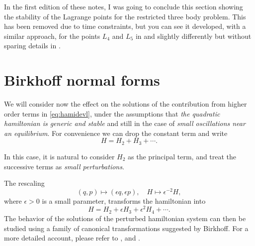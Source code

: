 \documentclass[english,fontsize=11pt,paper=b5]{scrbook}
\theoremstyle{definition}
\begin{document}
      In the first edition of these notes, I was going to conclude this section showing the stability of the Lagrange points for the restricted three body problem.
      This has been removed due to time constraints, but you can see it developed, with a similar approach, for the points $L_4$ and $L_5$ in \cite[Chapter 2.10]{book:lowenstein} and slightly differently but without sparing details in \cite{book:arnoldcelestial,book:celletti}.

      \section{Birkhoff normal forms}

      We will consider now the effect on the solutions of the contribution from higher order terms in \eqref{eq:hamidevl}, under the assumptions that \emph{the quadratic hamiltonian is generic and stable} and still in the case of \emph{small oscillations near an equilibrium}.
      For convenience we can drop the constant term and write
      \begin{equation}
        H = H_2 + H_3 + \cdots.
      \end{equation}

      In this case, it is natural to consider $H_2$ as the principal term, and treat the successive terms as \emph{small perturbations}.

      The rescaling
      \begin{equation}
        (q, p)\mapsto (\epsilon q, \epsilon p), \quad H \mapsto \epsilon^{-2} H,
      \end{equation}
      where $\epsilon > 0$ is a small parameter, transforms the hamiltonian into
      \begin{equation}
        H = H_2 + \epsilon H_3 + \epsilon^2 H_4 + \cdots.
      \end{equation}
      The behavior of the solutions of the perturbed hamiltonian system can then be studied using a family of canonical transformations suggested by Birkhoff.
      For a more detailed account, please refer to \cite[Chapter 6.5]{book:celletti}, \cite[Chapter 8.3]{book:arnoldcelestial} and \cite[Chapters 15.2 and 15.3]{book:knauf}.
\end{document}
